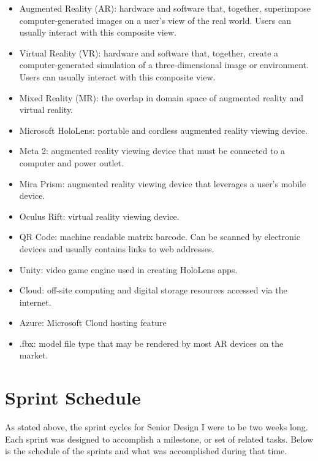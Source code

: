 \begin{itemize}
	\item Augmented Reality (AR): hardware and software that, together, superimpose computer-generated images on a user's view of the real world. Users can usually interact with this composite view.

	\item Virtual Reality (VR): hardware and software that, together, create a computer-generated simulation of a three-dimensional image or environment. Users can usually interact with this composite view.

	\item Mixed Reality (MR): the overlap in domain space of augmented reality and virtual reality. 

	\item Microsoft HoloLens: portable and cordless augmented reality viewing device. 

	\item Meta 2: augmented reality viewing device that must be connected to a computer and power outlet. 

	\item Mira Prism: augmented reality viewing device that leverages a user's mobile device.

	\item Oculus Rift: virtual reality viewing device. 

    \item QR Code: machine readable matrix barcode. Can be scanned by electronic devices and usually contains links to web addresses.
    
    \item Unity: video game engine used in creating HoloLens apps.

	\item Cloud: off-site computing and digital storage resources accessed via the internet. 

    \item Azure: Microsoft Cloud hosting feature

	\item .fbx: model file type that may be rendered by most AR devices on the market. 
\end{itemize}


\section{Sprint Schedule}
As stated above, the sprint cycles for Senior Design I were to be two weeks long. Each sprint was designed to accomplish a milestone, or set of related tasks. Below is the schedule of the sprints and what was accomplished during that time.

